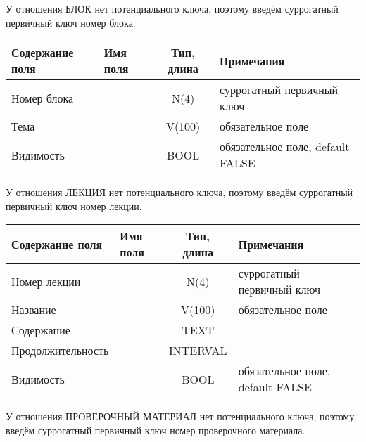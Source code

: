 \documentclass[a4paper,14pt]{article}
\begin{document}

У отношения БЛОК нет потенциального ключа, поэтому введём суррогатный первичный ключ номер блока.

\begin{table}[H]
	\begin{tabular}{|l|l|c|l|}
		\hline
		Содержание поля & Имя поля & Тип, длина & Примечания                       \\ \hline
		Номер блока     &          &    N(4)    & суррогатный первичный ключ       \\ \hline
		Тема            &          &    V(100)    & обязательное поле                \\ \hline
		Видимость       &          &    BOOL    & обязательное поле, default FALSE \\ \hline
	\end{tabular}
\end{table}


У отношения ЛЕКЦИЯ нет потенциального ключа, поэтому введём суррогатный первичный ключ номер лекции.

\begin{table}[H]
	\begin{tabular}{|l|l|c|l|}
		\hline
		Содержание поля   & Имя поля & Тип, длина & Примечания                       \\ \hline
		Номер лекции      &          &    N(4)    & суррогатный первичный ключ       \\ \hline
		Название          &          &    V(100)    & обязательное поле                \\ \hline
		Содержание        &          &    TEXT    &                                  \\ \hline
		Продолжительность &          &    INTERVAL    &                                  \\ \hline
		Видимость         &          &    BOOL    & обязательное поле, default FALSE \\ \hline
	\end{tabular}
\end{table}

У отношения ПРОВЕРОЧНЫЙ МАТЕРИАЛ нет потенциального ключа, поэтому введём суррогатный первичный ключ номер проверочного материала.
\end{document}
